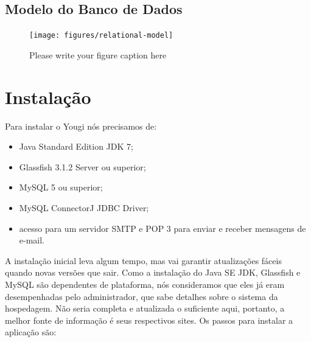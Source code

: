 \documentclass[envcountsame,envcountchap,letterpaper]{svmono}
\begin{document}
\section{Modelo do Banco de Dados}

\begin{figure}
\centering
\texttt{[image: figures/relational-model]}
\caption{Please write your figure caption here}
\label{fig:1}
\end{figure}

\chapter{Instalação}

Para instalar o Yougi nós precisamos de:

\begin{itemize}
\item Java Standard Edition JDK 7;
\item Glassfish 3.1.2 Server ou superior;
\item MySQL 5 ou superior;
\item MySQL ConnectorJ JDBC Driver;
\item acesso para um servidor SMTP e POP 3 para enviar e receber 			  mensagens de e-mail.
\end{itemize}

A instalação inicial leva algum tempo, mas vai garantir atualizações fáceis quando novas versões que sair. Como a instalação do Java SE JDK, Glassfish e MySQL são dependentes de plataforma, nós consideramos que eles já eram desempenhadas pelo administrador, que sabe detalhes sobre o sistema da hospedagem. Não seria completa e atualizada o suficiente aqui, portanto, a melhor fonte de informação é seus respectivos sites. Os passos para instalar a aplicação são:
\end{document}
